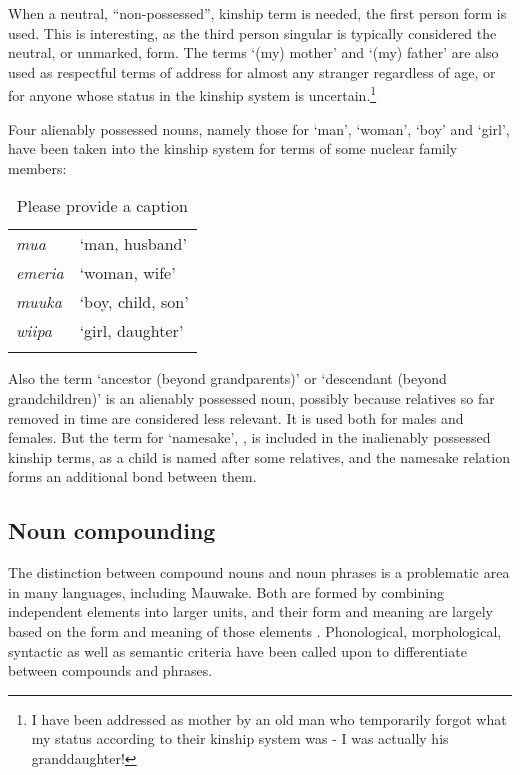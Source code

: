 When a neutral, ``non-possessed'', kinship term is needed, the first person form is used. This is interesting, as the third person singular is typically considered the neutral, or unmarked, form. The terms `(my) mother' and `(my) father' are also used as respectful terms of address for almost any stranger regardless of age, or for anyone whose status in the kinship system is uncertain.\footnote{I have been addressed as {\textquotedbl}mother{\textquotedbl} by an old man who temporarily forgot what my status according to their kinship system was - I was actually his granddaughter!}

Four alienably possessed nouns, namely those for `man', `woman', `boy' and `girl', have been taken into the kinship system for terms of some nuclear family members: 

\begin{table}
\caption{Please provide a caption}

\begin{tabular}{>{\itshape}ll}
\mytoprule
mua &`man, husband'\\
emeria &`woman, wife'\\
muuka &`boy, child, son'\\
wiipa &`girl, daughter'\\
\mybottomrule
\end{tabular}
\end{table}


Also the term  `ancestor (beyond grandparents)' or `descendant (beyond grandchildren)' is an alienably possessed noun, possibly because relatives so far removed in time are considered less relevant. It is used both for males and females. But the term for `namesake', , is included in the inalienably possessed kinship terms, as a child is named after some relatives, and the namesake relation forms an additional bond between them.

\subsection{Noun compounding}\label{sec:3.2.5}
{}
The distinction between compound nouns and noun phrases is a problematic area in many languages, including Mauwake. Both are formed by combining independent elements into larger units, and their form and meaning are largely based on the form and meaning of those elements \citep[40]{Anderson1985a}. Phonological, morphological, syntactic as well as semantic criteria have been called upon to differentiate between compounds and phrases.


